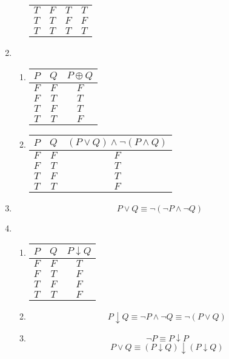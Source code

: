 \begin{enumerate}
\begin{enumerate}
\begin{tabular}{c | c | c | c}
            $T$ & $F$ & $T$ & $T$ \\
            $T$ & $T$ & $F$ & $F$ \\
            $T$ & $T$ & $T$ & $T$
        \end{tabular}
    \end{enumerate}
    \item
    \begin{enumerate}
        \item 
        \begin{tabular}{c | c | c}
            $P$ & $Q$ & $P \oplus Q$\\
            \hline
            $F$ & $F$ & $F$ \\
            $F$ & $T$ & $T$ \\
            $T$ & $F$ & $T$ \\
            $T$ & $T$ & $F$
        \end{tabular}
        \item 
        \begin{tabular}{c | c | c}
            $P$ & $Q$ & $(P \lor Q) \land \lnot(P \land Q)$\\
            \hline
            $F$ & $F$ & $F$ \\
            $F$ & $T$ & $T$ \\
            $T$ & $F$ & $T$ \\
            $T$ & $T$ & $F$
        \end{tabular}
    \end{enumerate}
    \item
    \[P \lor Q \equiv \lnot (\lnot P \land \lnot Q)\]
    \item
    \begin{enumerate}
        \item
        \begin{tabular}{c | c | c}
            $P$ & $Q$ & $P \downarrow Q$\\
            \hline
            $F$ & $F$ & $T$ \\
            $F$ & $T$ & $F$ \\
            $T$ & $F$ & $F$ \\
            $T$ & $T$ & $F$
        \end{tabular}
        \item 
        \[P \downarrow Q \equiv \lnot P \land \lnot Q \equiv \lnot (P \lor Q)\]
        \item 
        \[\lnot P \equiv P \downarrow P \]
        \[P \lor Q \equiv (P \downarrow Q) \downarrow (P \downarrow Q)\]

\end{enumerate}
\end{enumerate}
